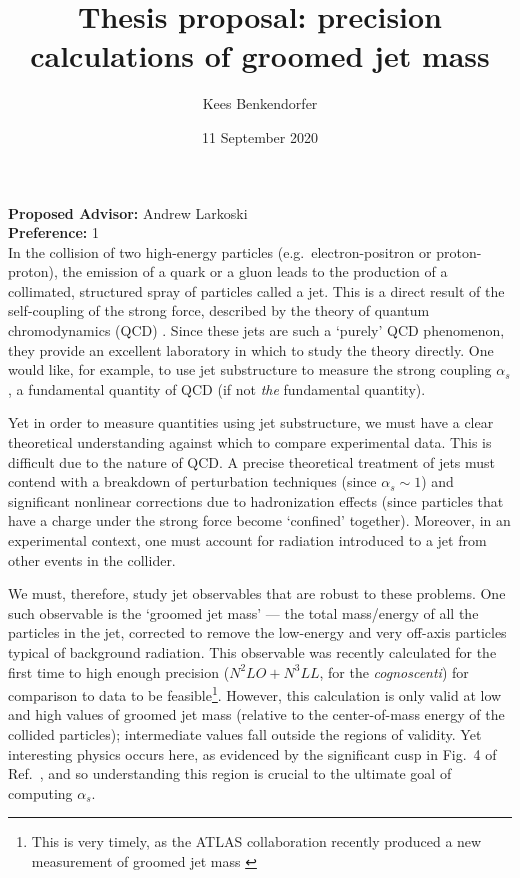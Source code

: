\documentclass[11pt,twoside,reqno]{amsart}
\title{Thesis proposal: precision calculations of groomed jet mass}
\author{Kees Benkendorfer}
\date{11 September 2020}
\theoremstyle{plain}
\theoremstyle{remark}
\theoremstyle{definition}
\theoremstyle{remark}
\theoremstyle{definition}
\theoremstyle{definition}
\begin{document}
\maketitle

\noindent\textbf{Proposed Advisor:} Andrew Larkoski \\
\noindent\textbf{Preference:} 1 \\

In the collision of two high-energy particles (e.g.\ electron-positron or proton-proton), the emission of a quark or a gluon leads to the production of a collimated, structured spray of particles called a jet. This is a direct result of the self-coupling of the strong force, described by the theory of quantum chromodynamics (QCD) \cite{larkoski_elementary_2019-1}. Since these jets are such a `purely' QCD phenomenon, they provide an excellent laboratory in which to study the theory directly. One would like, for example, to use jet substructure to measure the strong coupling $\alpha_s$, a fundamental quantity of QCD (if not \textit{the} fundamental quantity).

Yet in order to measure quantities using jet substructure, we must have a clear theoretical understanding against which to compare experimental data. This is difficult due to the nature of QCD. A precise theoretical treatment of jets must contend with a breakdown of perturbation techniques (since $\alpha_s \sim 1$) and significant nonlinear corrections due to hadronization effects (since particles that have a charge under the strong force become `confined' together). Moreover, in an experimental context, one must account for radiation introduced to a jet from other events in the collider.

We must, therefore, study jet observables that are robust to these problems. One such observable is the `groomed jet mass' --- the total mass/energy of all the particles in the jet, corrected to remove the low-energy and very off-axis particles typical of background radiation. This observable was recently calculated for the first time to high enough precision ($N^2LO + N^3LL$, for the \textit{cognoscenti}) \cite{kardos_groomed_2020,kardos_two-_2020} for comparison to data to be feasible\footnote{This is very timely, as the ATLAS collaboration recently produced a new measurement of groomed jet mass \cite{atlas_collaboration_measurement_2020-2}}. However, this calculation is only valid at low and high values of groomed jet mass (relative to the center-of-mass energy of the collided particles); intermediate values fall outside the regions of validity. Yet interesting physics occurs here, as evidenced by the significant cusp in Fig.\ 4 of Ref.\ \cite{kardos_groomed_2020}, and so understanding this region is crucial to the ultimate goal of computing $\alpha_s$.
\end{document}

